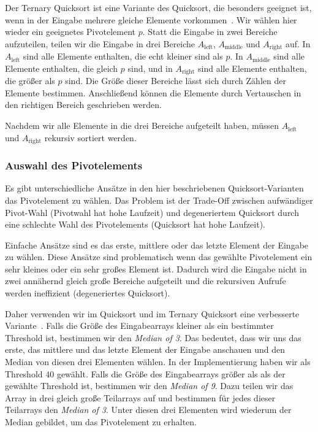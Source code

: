 Der Ternary Quicksort ist eine Variante des Quicksort, die besonders geeignet ist,
wenn in der Eingabe mehrere gleiche Elemente vorkommen~\cite{ternary_quicksort}.
Wir wählen hier wieder ein geeignetes Pivotelement $p$.
Statt die Eingabe in zwei Bereiche aufzuteilen, teilen wir die Eingabe in drei Bereiche $A_{\text{left}}$, $A_{\text{middle}}$ und $A_{\text{right}}$ auf.
In $A_{\text{left}}$ sind alle Elemente enthalten, die echt kleiner sind als $p$.
In $A_{\text{middle}}$ sind alle Elemente enthalten, die gleich $p$ sind, und in $A_{\text{right}}$ sind alle Elemente enthalten, die größer als $p$ sind.
Die Größe dieser Bereiche lässt sich durch Zählen der Elemente bestimmen.
Anschließend können die Elemente durch Vertauschen in den richtigen Bereich geschrieben werden.

Nachdem wir alle Elemente in die drei Bereiche aufgeteilt haben, müssen $A_{\text{left}}$ und $A_{\text{right}}$ rekursiv sortiert werden.

\subsubsection{Auswahl des Pivotelements}

Es gibt unterschiedliche Ansätze in den hier beschriebenen Quicksort-Varianten das Pivotelement zu wählen.
Das Problem ist der Trade-Off zwischen aufwändiger Pivot-Wahl (Pivotwahl hat hohe Laufzeit) und
degeneriertem Quicksort durch eine schlechte Wahl des Pivotelements (Quicksort hat hohe Laufzeit).

Einfache Ansätze sind es das erste, mittlere oder das letzte Element der Eingabe zu wählen.
Diese Ansätze sind problematisch wenn das gewählte Pivotelement ein sehr kleines oder ein sehr großes Element ist.
Dadurch wird die Eingabe nicht in zwei annähernd gleich große Bereiche aufgeteilt und die rekursiven Aufrufe werden ineffizient (degeneriertes Quicksort).

Daher verwenden wir im Quicksort und im Ternary Quicksort eine verbesserte Variante~\cite{ternary_quicksort}.
Falls die Größe des Eingabearrays kleiner als ein bestimmter Threshold ist,
bestimmen wir den \emph{Median of 3}. Das bedeutet, dass wir uns das erste,
das mittlere und das letzte Element der Eingabe anschauen und den Median von diesen drei Elementen wählen.
In der Implementierung haben wir als Threshold $40$ gewählt.
Falls die Größe des Eingabearrays größer als als der gewählte Threshold ist,
bestimmen wir den \emph{Median of 9}. Dazu teilen wir das Array in drei gleich große Teilarrays auf
und bestimmen für jedes dieser Teilarrays den \emph{Median of 3}.
Unter diesen drei Elementen wird wiederum der Median gebildet, um das Pivotelement zu erhalten.